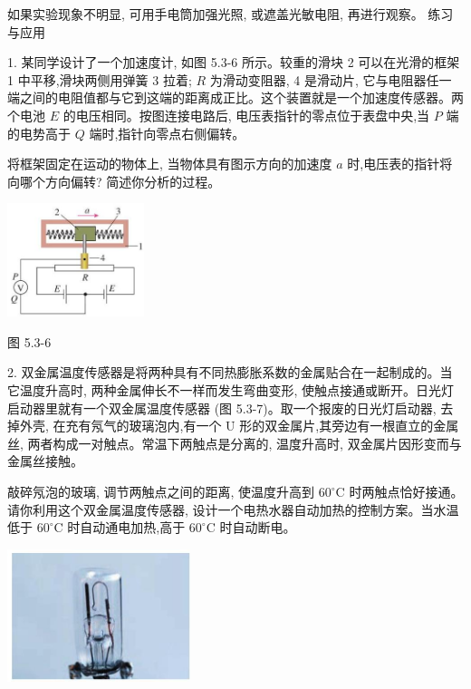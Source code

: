 \documentclass[10pt]{article}
\begin{document}
如果实验现象不明显, 可用手电筒加强光照, 或遮盖光敏电阻, 再进行观察。 练习与应用

1. 某同学设计了一个加速度计, 如图 5.3-6 所示。较重的滑块 2 可以在光滑的框架 1 中平移,滑块两侧用弹簧 3 拉着; \(R\) 为滑动变阻器, 4 是滑动片, 它与电阻器任一端之间的电阻值都与它到这端的距离成正比。这个装置就是一个加速度传感器。两个电池 \(E\) 的电压相同。按图连接电路后, 电压表指针的零点位于表盘中央,当 \(P\) 端的电势高于 \(Q\) 端时,指针向零点右侧偏转。

将框架固定在运动的物体上, 当物体具有图示方向的加速度 \(a\) 时,电压表的指针将向哪个方向偏转? 简述你分析的过程。

\begin{center}
\includegraphics[max width=0.3\textwidth]{images/01910e72-c5b7-7ed5-a6d4-fb3a5faefc32_112_756311.jpg}
\end{center}

图 5.3-6

2. 双金属温度传感器是将两种具有不同热膨胀系数的金属贴合在一起制成的。当它温度升高时, 两种金属伸长不一样而发生弯曲变形, 使触点接通或断开。日光灯启动器里就有一个双金属温度传感器 (图 5.3-7)。取一个报废的日光灯启动器, 去掉外壳, 在充有氖气的玻璃泡内,有一个 \(\mathrm{U}\) 形的双金属片,其旁边有一根直立的金属丝, 两者构成一对触点。常温下两触点是分离的, 温度升高时, 双金属片因形变而与金属丝接触。

敲碎氖泡的玻璃, 调节两触点之间的距离, 使温度升高到 \({60}^{ \circ }\mathrm{C}\) 时两触点恰好接通。请你利用这个双金属温度传感器, 设计一个电热水器自动加热的控制方案。当水温低于 \({60}^{ \circ }\mathrm{C}\) 时自动通电加热,高于 \({60}^{ \circ }\mathrm{C}\) 时自动断电。

\begin{center}
\includegraphics[max width=0.4\textwidth]{images/01910e72-c5b7-7ed5-a6d4-fb3a5faefc32_112_234042.jpg}
\end{center}
\end{document}
